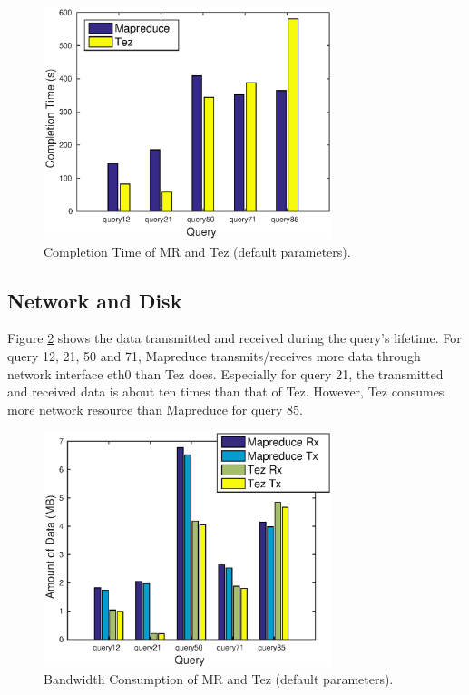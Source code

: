 \documentclass[10pt]{article}
\begin{document}
\begin{figure}
\begin{center}
\includegraphics[width=0.75\textwidth]{pic/q1a_time}
\caption{Completion Time of MR and Tez (default parameters).}
\label{fig:q1a_time}
\end{center}
\end{figure}


\subsection{Network and Disk}
Figure \ref{fig:q1b_net} shows the data transmitted and received during the query's lifetime. For query 12, 21, 50 and 71, Mapreduce transmits/receives more data through network interface eth0 than Tez does. Especially for query 21, the transmitted and received data is about ten times than that of Tez. However, Tez consumes more network resource than Mapreduce for query 85.

\begin{figure}
\begin{center}
\includegraphics[width=0.75\textwidth]{pic/q1b_net}
\caption{Bandwidth Consumption of MR and Tez (default parameters).}
\label{fig:q1b_net}
\end{center}
\end{figure}
\end{document}
